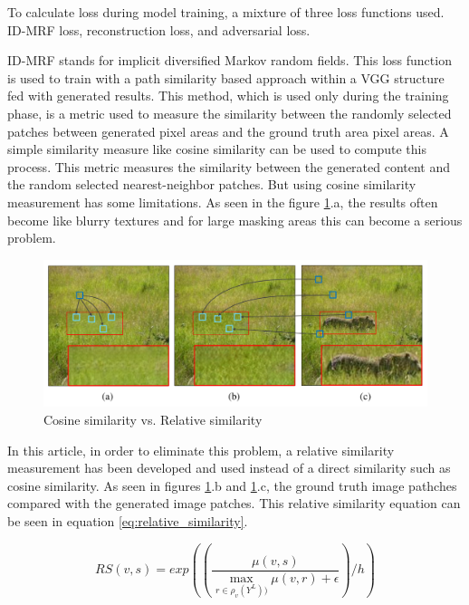 To calculate loss during model training, a mixture of three loss functions used. ID-MRF loss, reconstruction loss, and adversarial loss.

ID-MRF stands for implicit diversified Markov random fields. This loss function is used to train with a path similarity based approach within a VGG structure fed with generated results. This method, which is used only during the training phase, is a metric used to measure the similarity between the randomly selected patches between generated pixel areas and the ground truth area pixel areas. A simple similarity measure like cosine similarity can be used to compute this process. This metric measures the similarity between the generated content and the random selected nearest-neighbor patches. But using cosine similarity measurement has some limitations. As seen in the figure \ref{fig:cosine_similarity}.a, the results often become like blurry textures and for large masking areas this can become a serious problem.

\begin{figure}[h]
    \centering
    \includegraphics[width=13cm]{figures/chapter4/cosine_similarity.png}
    \caption{Cosine similarity vs. Relative similarity \cite{inpainting_via_multi_cnn}}
    \label{fig:cosine_similarity}
\end{figure}

In this article, in order to eliminate this problem, a relative similarity measurement has been developed and used instead of a direct similarity such as cosine similarity. As seen in figures \ref{fig:cosine_similarity}.b and \ref{fig:cosine_similarity}.c, the ground truth image pathches compared with the generated image patches. This relative similarity equation can be seen in equation \ref{eq:relative_similarity}.

\begin{equation}
    RS(v, s) = exp((\frac{\mu (v, s)}{\max_{r\in \rho_{v} (Y^{L}))} \mu(v,r) + \epsilon }) / h)
    \label{eq:relative_similarity}
\end{equation}

